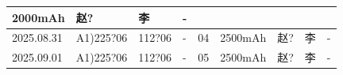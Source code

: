 \documentclass[UTF8,10pt,a4paper,fontset=fandol]{ctexart}
\newcommand{\fieldvalue}[1]{#1}
\newcommand{\handwritten}[1]{#1}
\begin{document}
\begin{tabular}{|p{1.55cm}|p{2.05cm}|p{1.35cm}|p{1.35cm}|p{1.55cm}|p{1.45cm}|p{1.25cm}|p{1.25cm}|p{1.20cm}|}
\fieldvalue{\handwritten{2000mAh}} &
\fieldvalue{\handwritten{赵?}} &
\fieldvalue{\handwritten{李}} &
\fieldvalue{\handwritten{-}} \\
\hline
\fieldvalue{\handwritten{2025.08.31}} &
\fieldvalue{\handwritten{A1)225?06}} &
\fieldvalue{\handwritten{112?06}} &
\fieldvalue{\handwritten{-}} &
\fieldvalue{\handwritten{04}} &
\fieldvalue{\handwritten{2500mAh}} &
\fieldvalue{\handwritten{赵?}} &
\fieldvalue{\handwritten{李}} &
\fieldvalue{\handwritten{-}} \\
\hline
\fieldvalue{\handwritten{2025.09.01}} &
\fieldvalue{\handwritten{A1)225?06}} &
\fieldvalue{\handwritten{112?06}} &
\fieldvalue{\handwritten{-}} &
\fieldvalue{\handwritten{05}} &
\fieldvalue{\handwritten{2500mAh}} &
\fieldvalue{\handwritten{赵?}} &
\fieldvalue{\handwritten{李}} &
\fieldvalue{\handwritten{-}} \\
\hline
\end{tabular}
\end{document}
